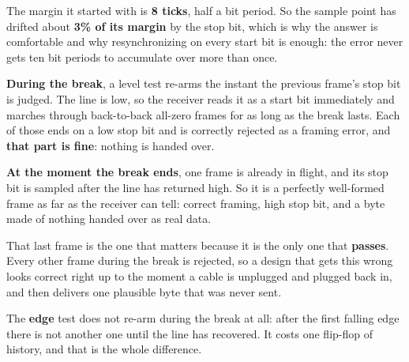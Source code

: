 The margin it started with is \textbf{8 ticks}, half a bit period. So the sample point has drifted
about \textbf{3\% of its margin} by the stop bit, which is why the answer is comfortable and why
resynchronizing on every start bit is enough: the error never gets ten bit periods to accumulate
over more than once. 

\textbf{During the break}, a level test re-arms the instant the previous frame's stop bit is judged.
The line is low, so the receiver reads it as a start bit immediately and marches through
back-to-back all-zero frames for as long as the break lasts. Each of those ends on a low stop bit
and is correctly rejected as a framing error, and \textbf{that part is fine}: nothing is handed
over. 

\textbf{At the moment the break ends}, one frame is already in flight, and its stop bit is sampled
after the line has returned high. So it is a perfectly well-formed frame as far as the receiver can
tell: correct framing, high stop bit, and a byte made of nothing handed over as real data.

That last frame is the one that matters because it is the only one that \textbf{passes}. Every
other frame during the break is rejected, so a design that gets this wrong looks correct right up to
the moment a cable is unplugged and plugged back in, and then delivers one plausible byte that was
never sent.

The \textbf{edge} test does not re-arm during the break at all: after the first falling edge there
is not another one until the line has recovered. It costs one flip-flop of history, and that is the
whole difference. 

